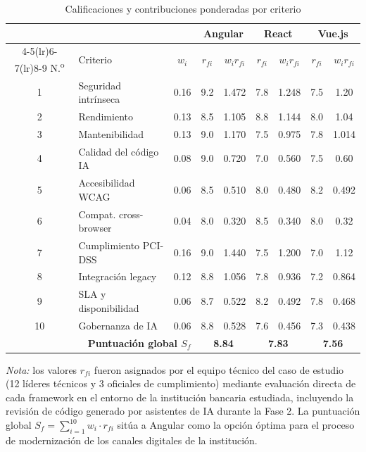 \begin{table}[htbp]
\centering
\caption{Calificaciones y contribuciones ponderadas por criterio}
\label{tab:4.7}
\scriptsize
\begin{tabular}{@{}clc cc cc cc@{}}
\toprule
& & & \multicolumn{2}{c}{Angular} & \multicolumn{2}{c}{React} & \multicolumn{2}{c}{Vue.js} \\
\cmidrule(lr){4-5}\cmidrule(lr){6-7}\cmidrule(lr){8-9}
N.\textsuperscript{o} & Criterio & $w_i$ & $r_{fi}$ & $w_i r_{fi}$ & $r_{fi}$ & $w_i r_{fi}$ & $r_{fi}$ & $w_i r_{fi}$ \\
\midrule
1  & Seguridad intrínseca         & 0.16 & 9.2 & 1.472 & 7.8 & 1.248 & 7.5 & 1.20 \\
2  & Rendimiento                  & 0.13 & 8.5 & 1.105 & 8.8 & 1.144 & 8.0 & 1.04 \\
3  & Mantenibilidad               & 0.13 & 9.0 & 1.170 & 7.5 & 0.975 & 7.8 & 1.014 \\
4  & Calidad del código IA        & 0.08 & 9.0 & 0.720 & 7.0 & 0.560 & 7.5 & 0.60 \\
5  & Accesibilidad WCAG           & 0.06 & 8.5 & 0.510 & 8.0 & 0.480 & 8.2 & 0.492 \\
6  & Compat. cross-browser        & 0.04 & 8.0 & 0.320 & 8.5 & 0.340 & 8.0 & 0.32 \\
7  & Cumplimiento PCI-DSS         & 0.16 & 9.0 & 1.440 & 7.5 & 1.200 & 7.0 & 1.12 \\
8  & Integración legacy           & 0.12 & 8.8 & 1.056 & 7.8 & 0.936 & 7.2 & 0.864 \\
9  & SLA y disponibilidad         & 0.06 & 8.7 & 0.522 & 8.2 & 0.492 & 7.8 & 0.468 \\
10 & Gobernanza de IA             & 0.06 & 8.8 & 0.528 & 7.6 & 0.456 & 7.3 & 0.438 \\
\midrule
\multicolumn{3}{r}{\textbf{Puntuación global $S_f$}} & \multicolumn{2}{c}{\textbf{8.84}} & \multicolumn{2}{c}{\textbf{7.83}} & \multicolumn{2}{c}{\textbf{7.56}} \\
\bottomrule
\end{tabular}
\end{table}

\noindent \textit{Nota:} los valores $r_{fi}$ fueron asignados por el equipo
técnico del caso de estudio (12 líderes técnicos y 3 oficiales de
cumplimiento) mediante evaluación directa de cada framework en el entorno de
la institución bancaria estudiada, incluyendo la revisión de código generado
por asistentes de IA durante la Fase 2. La puntuación global $S_f =
\sum_{i=1}^{10} w_i \cdot r_{fi}$ sitúa a Angular como la opción óptima para
el proceso de modernización de los canales digitales de la institución.

